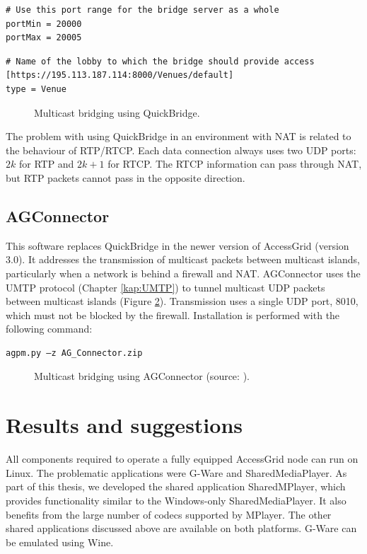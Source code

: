 \begin{verbatim}
# Use this port range for the bridge server as a whole
portMin = 20000
portMax = 20005
\end{verbatim}

\begin{verbatim}
# Name of the lobby to which the bridge should provide access
[https://195.113.187.114:8000/Venues/default]
type = Venue
\end{verbatim}

\begin{figure}
\centering

\caption{Multicast bridging using QuickBridge.}
\label{fig:QuickBridge}
\end{figure}

The problem with using QuickBridge in an environment with NAT is related to the behaviour of RTP/RTCP. Each data connection always uses two UDP ports: $2k$ for RTP and $2k+1$ for RTCP. The RTCP information can pass through NAT, but RTP packets cannot pass in the opposite direction.

\subsection{AGConnector}
This software replaces QuickBridge in the newer version of AccessGrid (version 3.0). It addresses the transmission of multicast packets between multicast islands, particularly when a network is behind a firewall and NAT. AGConnector uses the UMTP protocol (Chapter \ref{kap:UMTP}) to tunnel multicast UDP packets between multicast islands (Figure \ref{fig:AGConnector}). Transmission uses a single UDP port, 8010, which must not be blocked by the firewall. Installation is performed with the following command:
\begin{verbatim}
agpm.py –z AG_Connector.zip
\end{verbatim}

\begin{figure}
\centering

\caption{Multicast bridging using AGConnector (source: \protect\cite{AG-Connector}).}
\label{fig:AGConnector}
\end{figure}

\section{Results and suggestions}
All components required to operate a fully equipped AccessGrid node can run on Linux. The problematic applications were G-Ware and SharedMediaPlayer. As part of this thesis, we developed the shared application SharedMPlayer, which provides functionality similar to the Windows-only SharedMediaPlayer. It also benefits from the large number of codecs supported by MPlayer. The other shared applications discussed above are available on both platforms. G-Ware can be emulated using Wine.

